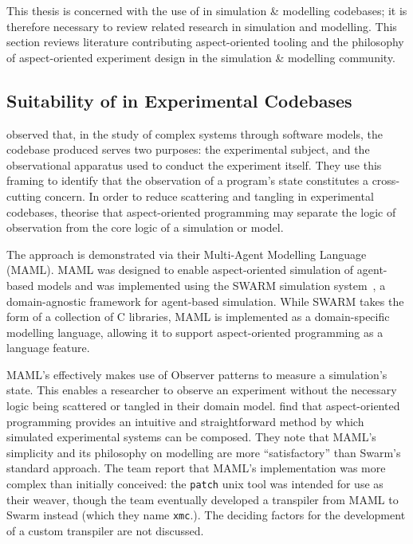 This thesis is concerned with the use of \aspectorientation{} in simulation \&
modelling codebases; it is therefore necessary to review related research in
simulation and modelling. This section reviews literature contributing
aspect-oriented tooling and the philosophy of aspect-oriented experiment design
in the simulation \& modelling community.

\subsection{Suitability of \AspectOrientation{} in Experimental Codebases}
\label{review_gulyas_use_of_aop_in_research_codebases}

\citet{gulyas1999use} observed that, in the study of complex systems through
software models, the codebase produced serves two purposes: the
experimental subject, and the observational apparatus used to conduct the
experiment itself. They use this framing to identify that the observation of a
program's state constitutes a cross-cutting concern. In order to reduce
scattering and tangling in experimental codebases, \citeauthor{gulyas1999use}
theorise that aspect-oriented programming may separate the logic of observation
from the core logic of a simulation or model.

The approach is demonstrated via their Multi-Agent Modelling Language (MAML). MAML
was designed to enable aspect-oriented simulation of agent-based models and was
implemented using the SWARM simulation system~\citep{hiebeler1994swarm}, a
domain-agnostic framework for agent-based simulation. While SWARM takes the form
of a collection of C libraries, MAML is implemented as a domain-specific
modelling language, allowing it to support aspect-oriented programming as a
language feature.

MAML's \aspectorientation{} effectively makes use of Observer patterns to measure
a simulation's state. This enables a researcher to observe an experiment without
the necessary logic being scattered or tangled in their domain model.
\citeauthor{gulyas1999use} find that aspect-oriented programming provides an
intuitive and straightforward method by which simulated experimental systems can
be composed. They note that MAML's simplicity and its philosophy on modelling
are more ``satisfactory'' than Swarm's standard approach. The team report that
MAML's implementation was more complex than initially conceived: the
\lstinline{patch} unix tool was intended for use as their weaver, though the
team eventually developed a transpiler from MAML to Swarm instead (which they
name \lstinline{xmc}.). The deciding factors for the development of a custom
transpiler are not discussed.

